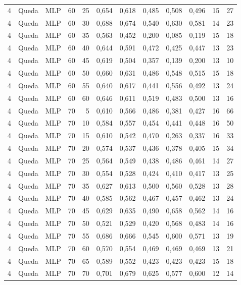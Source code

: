 \begin{longtable}{@{}rllrrrrrrrrr@{}}
4 & Queda & MLP & 60 & 25 & 0,654 & 0,618 & 0,485 & 0,508 & 0,496 & 15 & 27 \\
4 & Queda & MLP & 60 & 30 & 0,688 & 0,674 & 0,540 & 0,630 & 0,581 & 14 & 23 \\
4 & Queda & MLP & 60 & 35 & 0,563 & 0,452 & 0,200 & 0,085 & 0,119 & 15 & 18 \\
4 & Queda & MLP & 60 & 40 & 0,644 & 0,591 & 0,472 & 0,425 & 0,447 & 13 & 23 \\
4 & Queda & MLP & 60 & 45 & 0,619 & 0,504 & 0,357 & 0,139 & 0,200 & 13 & 10 \\
4 & Queda & MLP & 60 & 50 & 0,660 & 0,631 & 0,486 & 0,548 & 0,515 & 15 & 18 \\
4 & Queda & MLP & 60 & 55 & 0,640 & 0,617 & 0,441 & 0,556 & 0,492 & 13 & 24 \\
4 & Queda & MLP & 60 & 60 & 0,646 & 0,611 & 0,519 & 0,483 & 0,500 & 13 & 16 \\
4 & Queda & MLP & 70 & 5 & 0,610 & 0,566 & 0,486 & 0,381 & 0,427 & 16 & 66 \\
4 & Queda & MLP & 70 & 10 & 0,584 & 0,557 & 0,454 & 0,441 & 0,448 & 16 & 50 \\
4 & Queda & MLP & 70 & 15 & 0,610 & 0,542 & 0,470 & 0,263 & 0,337 & 16 & 33 \\
4 & Queda & MLP & 70 & 20 & 0,574 & 0,537 & 0,436 & 0,378 & 0,405 & 15 & 34 \\
4 & Queda & MLP & 70 & 25 & 0,564 & 0,549 & 0,438 & 0,486 & 0,461 & 14 & 27 \\
4 & Queda & MLP & 70 & 30 & 0,554 & 0,528 & 0,424 & 0,410 & 0,417 & 13 & 25 \\
4 & Queda & MLP & 70 & 35 & 0,627 & 0,613 & 0,500 & 0,560 & 0,528 & 13 & 28 \\
4 & Queda & MLP & 70 & 40 & 0,585 & 0,562 & 0,467 & 0,457 & 0,462 & 13 & 24 \\
4 & Queda & MLP & 70 & 45 & 0,629 & 0,635 & 0,490 & 0,658 & 0,562 & 14 & 16 \\
4 & Queda & MLP & 70 & 50 & 0,521 & 0,529 & 0,420 & 0,568 & 0,483 & 14 & 16 \\
4 & Queda & MLP & 70 & 55 & 0,686 & 0,666 & 0,545 & 0,600 & 0,571 & 13 & 19 \\
4 & Queda & MLP & 70 & 60 & 0,570 & 0,554 & 0,469 & 0,469 & 0,469 & 13 & 21 \\
4 & Queda & MLP & 70 & 65 & 0,589 & 0,552 & 0,423 & 0,423 & 0,423 & 15 & 18 \\
4 & Queda & MLP & 70 & 70 & 0,701 & 0,679 & 0,625 & 0,577 & 0,600 & 12 & 14 \\

\end{longtable}
